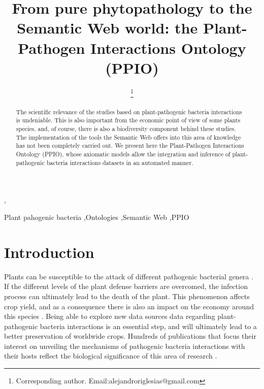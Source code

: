 \documentclass[sw]{iosart2c}
\begin{document}
\begin{frontmatter}

\title{From pure phytopathology to the Semantic Web world: the Plant-Pathogen Interactions Ontology (PPIO)}
\runningtitle{}




\author[A]{ \thanks{Corresponding author. Email:alejandroriglesias@gmail.com}},
\author[A]{ }
\author[A]{ }
\author[A]{ }
\runningauthor{}
\address[A]{Biological Informatics Group, Centre for Plant Biotechnology and Genomics (CBGP), Technical University of Madrid (UPM), Spain}

\begin{abstract}
The scientific relevance of the studies based on plant-pathogenic bacteria interactions is undeniable. This is also important from the economic point of view of some plants species, and, of course, there is also a biodiversity component behind these studies. The implementation of the tools the Semantic Web offers into this area of knowledge has not been completely carried out. We present here the Plant-Pathogen Interactions Ontology (PPIO), whose axiomatic models allow the integration and inference of plant-pathogenic bacteria interactions datasets in an automated manner.
\end{abstract}

\begin{keyword}
 Plant pahogenic bacteria \sep Ontologies \sep Semantic Web \sep PPIO
\end{keyword}

\end{frontmatter}


\section{Introduction}\label{s1}

Plants can be susceptible to the attack of different pathogenic bacterial genera \cite{Mansfield}. If the different levels of the plant defense barriers are overcomed, the infection process can ultimately lead to the death of the plant. This phenomenon affects crop yield, and as a consequence there is also an impact on the economy around this species \cite{Montesinos}. Being able to explore new data sources data regarding plant-pathogenic bacteria interactions is an essential step, and will ultimately lead to a better preservation of worldwide crops. Hundreds of publications that focus their interest on unveiling the mechanisms of pathogenic bacteria interactions with their hosts reflect the biological significance of this area of research \cite{DeWit} \cite {Dodds}.
\end{document}
